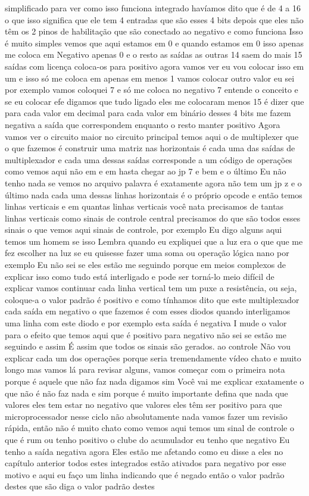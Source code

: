 \documentclass[oneside,11pt]{memoir} %
\begin{document}
simplificado para ver como isso funciona  integrado  havíamos dito que é de 4 a 16 o que  isso significa que ele tem 4 entradas que  são esses 4 bits depois que eles não têm  os 2 pinos de habilitação que são  conectado ao negativo e como funciona  Isso é muito simples  vemos que aqui estamos em 0 e quando  estamos em 0 isso apenas me coloca em  Negativo apenas 0 e o resto  as saídas as outras 14 saem do  mais 15 saídas com licença coloca-os para  positivo agora vamos ver eu vou colocar isso  em um e isso só me coloca em apenas  em menos 1 vamos colocar outro  valor eu sei por exemplo vamos  coloquei 7 e só me coloca no negativo  7 entende o conceito e se eu colocar  efe digamos que tudo ligado eles me colocaram  menos 15 é dizer que  para cada valor em decimal  para cada valor em binário desses 4  bits me fazem negativa a saída que  correspondem enquanto o resto  manter positivo  Agora vamos ver o circuito  maior  no circuito principal temos aqui o  de multiplexer que o que fazemos é  construir uma matriz nas horizontais  é cada uma das saídas de  multiplexador e cada uma dessas saídas  corresponde a um código de operações  como vemos aqui não em e em hasta  chegar ao jp 7 e bem e o último  Eu não tenho nada se vemos no arquivo  palavra é exatamente agora não  tem um jp z e o último nada  cada uma dessas linhas horizontais é  o próprio opcode  e então temos linhas verticais e  em quantas linhas verticais você nata  precisamos de tantas linhas verticais  como sinais de controle central  precisamos do que são todos esses sinais  o que vemos aqui  sinais de controle, por exemplo  Eu digo alguns aqui temos um homem se isso  Lembra quando eu expliquei que a luz era o que  que me fez escolher na luz se eu quisesse  fazer uma soma ou operação lógica  nano por exemplo  Eu não sei se eles estão me seguindo porque em  meios complexos de explicar isso como  tudo está interligado e pode ser  torná-lo meio difícil de explicar  vamos continuar  cada linha vertical tem um  puxe a resistência, ou seja, coloque-a  o valor padrão é positivo e como  tínhamos dito que este multiplexador  cada saída em negativo o que fazemos  é com esses diodos quando  interligamos uma linha com este diodo  e por exemplo esta saída é negativa I  mude o valor para o efeito que  temos aqui que é positivo para negativo  não sei se estão me seguindo e assim  É assim que todos os sinais são gerados.  ao controle  Não vou explicar cada um dos  operações porque seria tremendamente  vídeo chato e muito longo mas vamos lá  para revisar alguns, vamos começar com o  primeira nota  porque é aquele que não faz nada digamos sim  Você vai me explicar exatamente o que não é  não faz nada e sim porque é muito importante  defina que nada que valores eles tem  estar no negativo que valores eles têm  ser positivo para que  microprocessador nesse ciclo não  absolutamente nada vamos fazer um  revisão rápida, então não é muito  chato como vemos aqui temos um  sinal de controle  o que é rum ou tenho positivo  o clube do acumulador eu tenho que  negativo  Eu tenho a saída negativa agora  Eles estão me afetando como eu disse a eles  no capítulo anterior  todos estes integrados estão ativados  para negativo por esse motivo e aqui eu faço um  linha indicando que é negado então  o valor padrão destes que são  diga o valor padrão destes  
\end{document}

